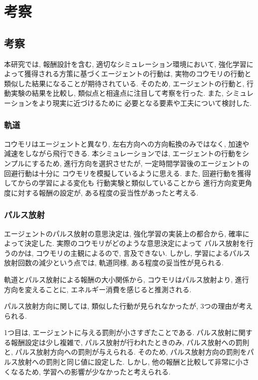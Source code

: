 \documentclass[../main]{subfiles}
\begin{document}
\newpage
\chapter{考察}
\label{chap:result}

\section{考察}
本研究では, 報酬設計を含む, 適切なシミュレーション環境において, 
強化学習によって獲得される方策に基づくエージェントの行動は, 
実物のコウモリの行動と類似した結果になることが期待されている.
そのため, エージェントの行動と, 行動実験の結果を比較し, 
類似点と相違点に注目して考察を行った. 
また, シミュレーションをより現実に近づけるために
必要となる要素や工夫について検討した.


\subsection{軌道}
コウモリはエージェントと異なり, 
左右方向への方向転換のみではなく, 
加速や減速をしながら飛行できる.
本シミュレーションでは, エージェントの行動をシンプルにするため, 
進行方向を選択させたが, 
一定時間学習後のエージェントの回避行動は十分に
コウモリを模擬しているように思える.
また, 回避行動を獲得してからの学習による変化も
行動実験と類似していることから
進行方向変更角度に対する報酬の設定が,
ある程度の妥当性があったと考える.


\subsection{パルス放射}
エージェントのパルス放射の意思決定は, 
強化学習の実装上の都合から, 
確率によって決定した.
実際のコウモリがどのような意思決定によって 
パルス放射を行うのかは, 
コウモリの主観によるので, 言及できない.
しかし, 学習によるパルス放射回数の減少という点では, 
軌道同様, ある程度の妥当性が見られる.

軌道とパルス放射による報酬の大小関係から, 
コウモリはパルス放射より, 
進行方向を変えることに,
エネルギー消費を感じると推測される.

パルス放射方向に関しては, 
類似した行動が見られなかったが, 
3つの理由が考えられる.

1つ目は, エージェントに与える罰則が小さすぎたことである.
パルス放射に関する報酬設定は少し複雑で, 
パルス放射が行われたときのみ, 
パルス放射への罰則と, パルス放射方向への罰則が与えられる.
そのため, パルス放射方向の罰則をパルス放射への罰則と同じ値に設定した.
しかし, 他の報酬と比較して非常に小さくなるため, 
学習への影響が少なかったと考えられる.
\end{document}
